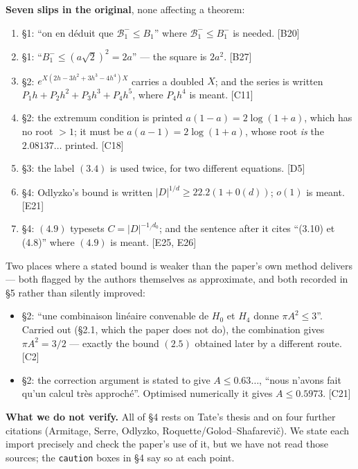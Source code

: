 \documentclass[11pt,reqno]{amsart}
\theoremstyle{plain}
\theoremstyle{definition}
\theoremstyle{remark}
\newcommand{\Bcal}{\mathcal{B}}
\newcommand{\Ledger}[1]{{\scriptsize\textsf{[#1]}}}
\begin{document}
\medskip
\noindent\textbf{Seven slips in the original}, none affecting a theorem:
\begin{enumerate}[label=(\roman*),leftmargin=2.2em]
\item \S1: ``on en d\'eduit que $\Bcal_1^-\le B_1$'' where $\Bcal_1^-\le B_1^-$ is
  needed. \Ledger{B20}
\item \S1: ``$B_1^-\le(a\sqrt2)^2=2a$'' --- the square is $2a^2$. \Ledger{B27}
\item \S2: $e^{X(2h-3h^2+3h^3-4h^4)X}$ carries a doubled $X$; and the series is
  written $P_1h+P_2h^2+P_3h^3+P_4h^5$, where $P_4h^4$ is meant. \Ledger{C11}
\item \S2: the extremum condition is printed $a(1-a)=2\log(1+a)$, which has no root
  $>1$; it must be $a(a-1)=2\log(1+a)$, whose root \emph{is} the $2.08137\ldots$
  printed. \Ledger{C18}
\item \S3: the label $(3.4)$ is used twice, for two different equations.
  \Ledger{D5}
\item \S4: Odlyzko's bound is written $|D|^{1/d}\ge22.2(1+0(d))$; $o(1)$ is meant.
  \Ledger{E21}
\item \S4: $(4.9)$ typesets $C=|D|^{-1_/d_0}$; and the sentence after it cites
  ``(3.10) et (4.8)'' where $(4.9)$ is meant. \Ledger{E25, E26}
\end{enumerate}

\smallskip
\noindent Two places where a stated bound is weaker than the paper's own method
delivers --- both flagged by the authors themselves as approximate, and both recorded
in \S5 rather than silently improved:
\begin{itemize}[leftmargin=1.6em]
\item \S2: ``une combinaison lin\'eaire convenable de $H_0$ et $H_4$ donne
  $\pi A^2\le 3$''. Carried out (\S2.1, which the paper does not do), the combination
  gives $\pi A^2=3/2$ --- exactly the bound $(2.5)$ obtained later by a different
  route. \Ledger{C2}
\item \S2: the correction argument is stated to give $A\le0.63\ldots$, ``nous n'avons
  fait qu'un calcul tr\`es approch\'e''. Optimised numerically it gives
  $A\le0.5973$. \Ledger{C21}
\end{itemize}

\medskip
\noindent\textbf{What we do not verify.} All of \S4 rests on Tate's thesis and on four
further citations (Armitage, Serre, Odlyzko, Roquette/Golod--Shafarevi\v c). We state
each import precisely and check the paper's use of it, but we have not read those
sources; the \texttt{caution} boxes in \S4 say so at each point.
\end{document}
